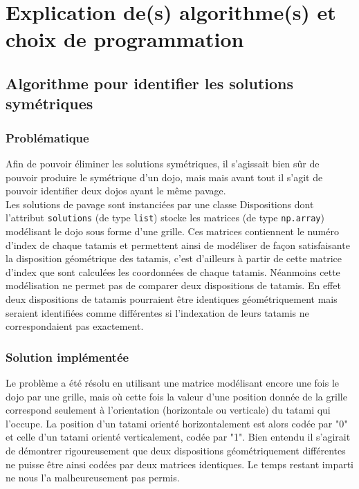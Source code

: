 \section{Explication de(s) algorithme(s) et choix de programmation}

\subsection{Algorithme pour identifier les solutions symétriques}

\subsubsection{Problématique}

Afin de pouvoir éliminer les solutions symétriques, il s’agissait bien sûr de pouvoir produire le symétrique d’un dojo,
mais mais avant tout il s’agit de pouvoir identifier deux dojos ayant le même pavage.\\

Les solutions de pavage sont instanciées par une classe Dispositions dont l’attribut \texttt{solutions}  (de type \texttt{list}) stocke
les matrices (de type \texttt{np.array}) modélisant le dojo sous forme d’une grille. Ces matrices contiennent le numéro d’index de
chaque tatamis et permettent ainsi de modéliser de façon satisfaisante la disposition géométrique des tatamis, c’est d’ailleurs
à partir de cette matrice d’index que sont calculées les coordonnées de chaque tatamis. Néanmoins cette modélisation ne permet
pas de comparer deux dispositions de tatamis. En effet deux dispositions de tatamis pourraient être identiques géométriquement
mais seraient identifiées comme différentes si l’indexation de leurs tatamis ne correspondaient pas exactement.

\subsubsection{Solution implémentée}

Le problème a été résolu en utilisant une matrice modélisant encore une fois le dojo par une grille, mais où cette fois la valeur d’une
position donnée de la grille correspond seulement à l’orientation (horizontale ou verticale) du tatami qui l’occupe.
La position d'un tatami orienté horizontalement est alors codée par "0" et celle d'un tatami orienté verticalement, codée par "1". Bien entendu
il s'agirait de démontrer rigoureusement que deux dispositions géométriquement différentes ne puisse être ainsi codées 
par deux matrices identiques. Le temps restant imparti ne nous l'a malheureusement pas permis.\\


